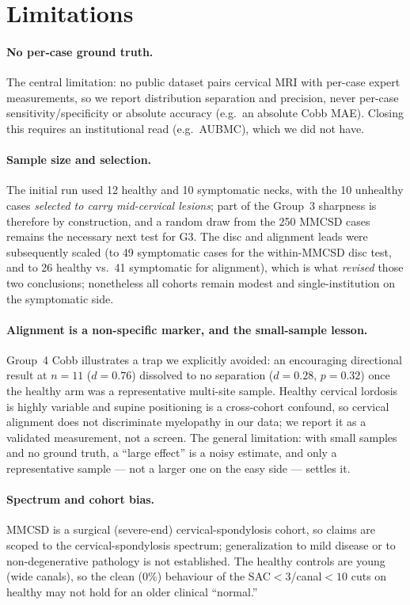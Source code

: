 \section{Limitations}
\label{sec:limits}

\paragraph{No per-case ground truth.} The central limitation: no public dataset pairs cervical MRI with
per-case expert measurements, so we report distribution separation and precision, never per-case
sensitivity/specificity or absolute accuracy (e.g.\ an absolute Cobb MAE). Closing this requires an
institutional read (e.g.\ AUBMC), which we did not have.

\paragraph{Sample size and selection.} The initial run used 12 healthy and 10 symptomatic necks, with the
10 unhealthy cases \emph{selected to carry mid-cervical lesions}; part of the Group~3 sharpness is
therefore by construction, and a random draw from the 250 MMCSD cases remains the necessary next test for
G3. The disc and alignment leads were subsequently scaled (to 49 symptomatic cases for the within-MMCSD
disc test, and to 26 healthy vs.\ 41 symptomatic for alignment), which is what \emph{revised} those two
conclusions; nonetheless all cohorts remain modest and single-institution on the symptomatic side.

\paragraph{Alignment is a non-specific marker, and the small-sample lesson.} Group~4 Cobb illustrates a
trap we explicitly avoided: an encouraging directional result at $n{=}11$ ($d{=}0.76$) dissolved to no
separation ($d{=}0.28$, $p{=}0.32$) once the healthy arm was a representative multi-site sample. Healthy
cervical lordosis is highly variable and supine positioning is a cross-cohort confound, so cervical
alignment does not discriminate myelopathy in our data; we report it as a validated measurement, not a
screen. The general limitation: with small samples and no ground truth, a ``large effect'' is a noisy
estimate, and only a representative sample --- not a larger one on the easy side --- settles it.

\paragraph{Spectrum and cohort bias.} MMCSD is a surgical (severe-end) cervical-spondylosis cohort, so
claims are scoped to the cervical-spondylosis spectrum; generalization to mild disease or to
non-degenerative pathology is not established. The healthy controls are young (wide canals), so the
clean (0\%) behaviour of the SAC$<3$/canal$<10$ cuts on healthy may not hold for an older clinical
``normal.''

